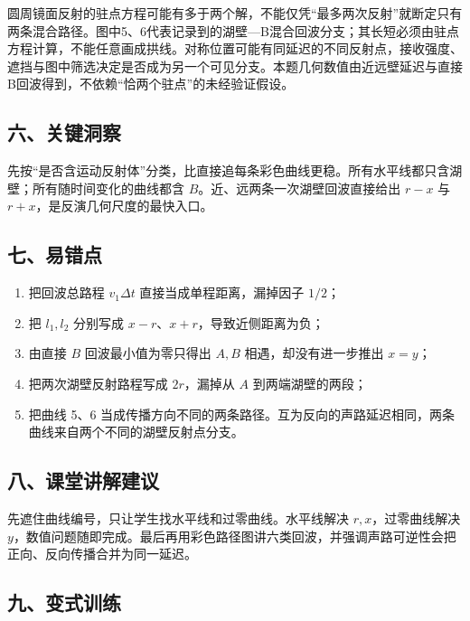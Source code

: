 \documentclass[12pt,a4paper,UTF8]{ctexart}
\newcommand{\tightlist}{\setlength{\itemsep}{0pt}\setlength{\parskip}{0pt}}
\begin{document}
圆周镜面反射的驻点方程可能有多于两个解，不能仅凭``最多两次反射''就断定只有两条混合路径。图中5、6代表记录到的湖壁---B混合回波分支；其长短必须由驻点方程计算，不能任意画成拱线。对称位置可能有同延迟的不同反射点，接收强度、遮挡与图中筛选决定是否成为另一个可见分支。本题几何数值由近远壁延迟与直接B回波得到，不依赖``恰两个驻点''的未经验证假设。

\subsection{六、关键洞察}\label{ux516dux5173ux952eux6d1eux5bdf-6}

先按``是否含运动反射体''分类，比直接追每条彩色曲线更稳。所有水平线都只含湖壁；所有随时间变化的曲线都含
\(B\)。近、远两条一次湖壁回波直接给出 \(r-x\) 与
\(r+x\)，是反演几何尺度的最快入口。

\subsection{七、易错点}\label{ux4e03ux6613ux9519ux70b9-6}

\begin{enumerate}
\def\labelenumi{\arabic{enumi}.}
\tightlist
\item
  把回波总路程 \(v_1\Delta t\) 直接当成单程距离，漏掉因子 \(1/2\)；
\item
  把 \(l_1,l_2\) 分别写成 \(x-r\)、\(x+r\)，导致近侧距离为负；
\item
  由直接 \(B\) 回波最小值为零只得出 \(A,B\) 相遇，却没有进一步推出
  \(x=y\)；
\item
  把两次湖壁反射路程写成 \(2r\)，漏掉从 \(A\) 到两端湖壁的两段；
\item
  把曲线 5、6
  当成传播方向不同的两条路径。互为反向的声路延迟相同，两条曲线来自两个不同的湖壁反射点分支。
\end{enumerate}

\subsection{八、课堂讲解建议}\label{ux516bux8bfeux5802ux8bb2ux89e3ux5efaux8bae-6}

先遮住曲线编号，只让学生找水平线和过零曲线。水平线解决
\(r,x\)，过零曲线解决
\(y\)，数值问题随即完成。最后再用彩色路径图讲六类回波，并强调声路可逆性会把正向、反向传播合并为同一延迟。

\subsection{九、变式训练}\label{ux4e5dux53d8ux5f0fux8badux7ec3-6}
\end{document}
